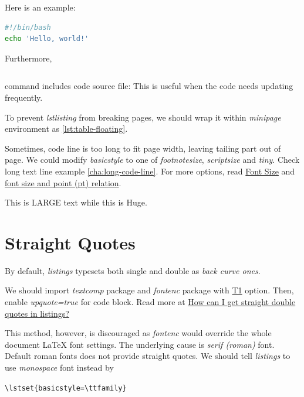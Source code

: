 Here is an example:

\begin{lstlisting}[language=bash,caption={Bash},frame=single]
#!/bin/bash
echo 'Hello, world!'
\end{lstlisting}

Furthermore,
\begin{lstlisting}[language=TeX,caption={Include code file},breaklines]

\end{lstlisting}
command includes code source file:
 This is useful when the code needs
updating frequently.

To prevent \textit{lstlisting} from breaking pages, we should wrap
it within \textit{minipage} environment as \ref{lst:table-floating}.

Sometimes, code line is too long to fit page width, leaving
tailing part out of page. We could modify \textit{basicstyle} to
one of \textit{footnotesize}, \textit{scriptsize} and
\textit{tiny}. Check long text line example
\ref{cha:long-code-line}. For more options, read
\href{https://tug.org/texinfohtml/latex2e.html#Font-sizes}{Font
  Size} and \href{https://tex.stackexchange.com/q/24599}{font size
  and point (pt) relation}.

{\LARGE This is LARGE text} {\Huge while this is Huge}.

\section{Straight Quotes}
\label{sec:straight-quotes}

By default, \textit{listings} typesets both single and double as
\textit{back curve ones}.

We should import \textit{textcomp} package and \textit{fontenc}
package with \href{https://tex.stackexchange.com/a/677}{T1}
option. Then, enable \textit{upquote=true} for code block. Read
more at \href{https://tex.stackexchange.com/q/166790}{How can I
  get straight double quotes in listings?}

This method, however, is discouraged as \textit{fontenc} would
override the whole document \LaTeX{} font settings. The underlying
cause is \textit{serif (roman)} font. Default roman fonts does not
provide straight quotes. We should tell \textit{listings} to use
\textit{monospace} font instead by

\begin{center}
  \verb|\lstset{basicstyle=\ttfamily}|
\end{center}

